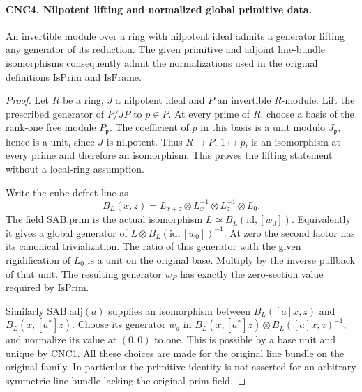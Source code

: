 \documentclass[11pt,a4paper]{article}
\numberwithin{equation}{section}
\theoremstyle{remark}\newtheorem{remark}[theorem]{Remark}
\begin{document}
\paragraph{CNC4. Nilpotent lifting and normalized global primitive data.}
\label{claim:CNC4}
An invertible module over a ring with nilpotent ideal admits a generator
lifting any generator of its reduction.  The given primitive and adjoint
line-bundle isomorphisms consequently admit the normalizations used in
the original definitions \(\mathrm{IsPrim}\) and \(\mathrm{IsFrame}\).
\begin{proof}
Let \(R\) be a ring, \(J\) a nilpotent ideal and \(P\) an invertible
\(R\)-module.  Lift the prescribed generator of \(P/JP\) to \(p\in P\).
At every prime of \(R\), choose a basis of the rank-one free module
\(P_\mathfrak p\).  The coefficient of \(p\) in this basis is a
unit modulo \(J_\mathfrak p\), hence is a unit, since \(J\) is
nilpotent.  Thus \(R\to P\), \(1\mapsto p\), is an isomorphism
at every prime and therefore an isomorphism.  This proves the lifting
statement without a local-ring assumption.

Write the cube-defect line as
\[
 B_L(x,z)=L_{x+z}\otimes L_x^{-1}\otimes L_z^{-1}\otimes L_0.
                                                               \tag{CNC.5}
\]
The field \(\mathrm{SAB}.\mathrm{prim}\) is the actual isomorphism
\(L\simeq B_L(\mathrm{id},[w_0])\).  Equivalently it gives a
global generator of
\(L\otimes B_L(\mathrm{id},[w_0])^{-1}\).
At zero the second factor has its canonical trivialization.  The ratio
of this generator with the given rigidification of \(L_0\) is a
unit on the original base.  Multiply by the inverse pullback of that
unit.  The resulting generator \(w_P\) has exactly the zero-section
value required by \(\mathrm{IsPrim}\).

Similarly \(\mathrm{SAB}.\mathrm{adj}(a)\) supplies an isomorphism
between \(B_L([a]x,z)\) and \(B_L(x,[a^*]z)\).  Choose its
generator \(w_a\) in
\(B_L(x,[a^*]z)\otimes B_L([a]x,z)^{-1}\), and normalize its
value at \((0,0)\) to one.  This is possible by a base unit and
unique by CNC1.  All these choices are made for the original line
bundle on the original family.  In particular the primitive identity
is not asserted for an arbitrary symmetric line bundle lacking the
original \(\mathrm{prim}\) field.
\end{proof}

\end{document}
